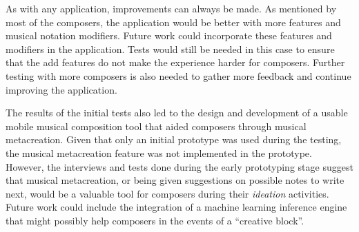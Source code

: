		As with any application, improvements can always be made. As mentioned by most of the composers, the application would be better with more features and musical notation modifiers. Future work could incorporate these features and modifiers in the application. Tests would still be needed in this case to ensure that the add features do not make the experience harder for composers. Further testing with more composers is also needed to gather more feedback and continue improving the application. 

		The results of the initial tests also led to the design and development of a usable mobile musical composition tool that aided composers through musical metacreation. Given that only an initial prototype was used during the testing, the musical metacreation feature was not implemented in the prototype. However, the interviews and tests done during the early prototyping stage suggest that musical metacreation, or being given suggestions on possible notes to write next, would be a valuable tool for composers during their \textit{ideation} activities. Future work could include the integration of a machine learning inference engine that might possibly help composers in the events of a ``creative block''.




